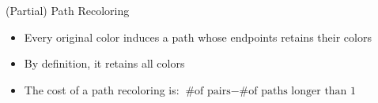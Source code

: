 \begin{frame}{(Partial) Path Recoloring}

\begin{itemize}

\item<1->
Every original color induces a path whose endpoints retains their colors 

\item<2->
By definition, it retains all colors 

\item<3->
The cost of a path recoloring is: 
$\text{\# of pairs} - \text{\# of paths longer than 1}$

\end{itemize}




\end{frame}